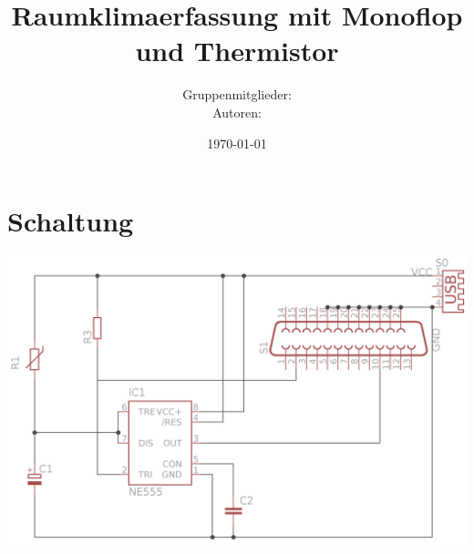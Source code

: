 \documentclass[12pt,titlepage]{article}
\title{\vspace{-1.5cm}Raumklimaerfassung mit Monoflop und Thermistor\vspace{-5mm}}
\author{Gruppenmitglieder: \\
			  Autoren: }
\date{\vspace{-2mm}\today}
\begin{document}
	\maketitle
	\tableofcontents	
	\newpage
	
	\section{Schaltung}
		\includegraphics[scale=1.5]{res/Schematik.png}
%				
%
%		
%		
%				
\end{document}
